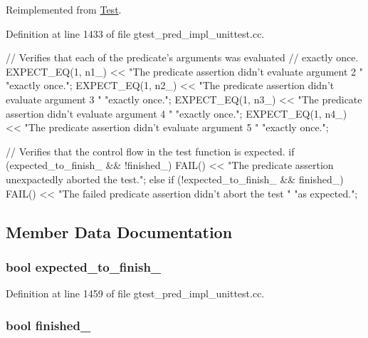 \-Reimplemented from \hyperlink{classtesting_1_1Test_a931587596081ef8178c2b128facb0411}{\-Test}.



\-Definition at line 1433 of file gtest\-\_\-pred\-\_\-impl\-\_\-unittest.\-cc.


\begin{DoxyCode}
                          {
    // Verifies that each of the predicate's arguments was evaluated
    // exactly once.
    EXPECT_EQ(1, n1_) <<
        "The predicate assertion didn't evaluate argument 2 "
        "exactly once.";
    EXPECT_EQ(1, n2_) <<
        "The predicate assertion didn't evaluate argument 3 "
        "exactly once.";
    EXPECT_EQ(1, n3_) <<
        "The predicate assertion didn't evaluate argument 4 "
        "exactly once.";
    EXPECT_EQ(1, n4_) <<
        "The predicate assertion didn't evaluate argument 5 "
        "exactly once.";

    // Verifies that the control flow in the test function is expected.
    if (expected_to_finish_ && !finished_) {
      FAIL() << "The predicate assertion unexpactedly aborted the test.";
    } else if (!expected_to_finish_ && finished_) {
      FAIL() << "The failed predicate assertion didn't abort the test "
                "as expected.";
    }
  }
\end{DoxyCode}


\subsection{\-Member \-Data \-Documentation}
\hypertarget{classPredicate4Test_af30fae6aaebdd5a6cb055c420573754d}{
\subsubsection[{expected\-\_\-to\-\_\-finish\-\_\-}]{\setlength{\rightskip}{0pt plus 5cm}bool {\bf expected\-\_\-to\-\_\-finish\-\_\-}}}\label{da/d30/classPredicate4Test_af30fae6aaebdd5a6cb055c420573754d}


\-Definition at line 1459 of file gtest\-\_\-pred\-\_\-impl\-\_\-unittest.\-cc.

\hypertarget{classPredicate4Test_a9189d6cfedf2ace6f5f6aa152ba38f83}{
\subsubsection[{finished\-\_\-}]{\setlength{\rightskip}{0pt plus 5cm}bool {\bf finished\-\_\-}}}\label{da/d30/classPredicate4Test_a9189d6cfedf2ace6f5f6aa152ba38f83}


